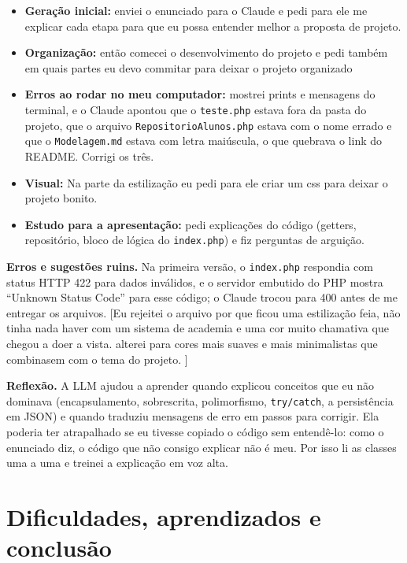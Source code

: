 \documentclass[12pt,a4paper]{article}
\newcommand{\pendente}[1]{{\color{red}[#1]}}
\begin{document}
\begin{itemize}
  \item \textbf{Geração inicial:} enviei o enunciado para o Claude e pedi para ele me explicar cada etapa para que eu possa entender melhor a proposta de projeto.
  \item \textbf{Organização:} então comecei o desenvolvimento do projeto e pedi também em quais partes eu devo commitar para deixar o projeto organizado
  \item \textbf{Erros ao rodar no meu computador:} mostrei prints e mensagens do terminal, e o Claude apontou que o \texttt{teste.php} estava fora da pasta do projeto, que o arquivo \texttt{RepositorioAlunos.php} estava com o nome errado e que o \texttt{Modelagem.md} estava com letra maiúscula, o que quebrava o link do README. Corrigi os três.
  \item \textbf{Visual:} Na parte da estilização eu pedi para ele criar um css para deixar o projeto bonito.
  \item \textbf{Estudo para a apresentação:} pedi explicações do código (getters, repositório, bloco de lógica do \texttt{index.php}) e fiz perguntas de arguição.
\end{itemize}

\textbf{Erros e sugestões ruins.} Na primeira versão, o \texttt{index.php} respondia com status HTTP 422 para dados inválidos, e o servidor embutido do PHP mostra ``Unknown Status Code'' para esse código; o Claude trocou para 400 antes de me entregar os arquivos. \pendente{Eu rejeitei o arquivo por que ficou uma estilização feia, não tinha nada haver com um sistema de academia e uma cor muito chamativa que chegou a doer a vista. alterei para cores mais suaves e mais minimalistas que combinasem com o tema do projeto.
}

\textbf{Reflexão.} A LLM ajudou a aprender quando explicou conceitos que eu não dominava (encapsulamento, sobrescrita, polimorfismo, \texttt{try/catch}, a persistência em JSON) e quando traduziu mensagens de erro em passos para corrigir. Ela poderia ter atrapalhado se eu tivesse copiado o código sem entendê-lo: como o enunciado diz, o código que não consigo explicar não é meu. Por isso li as classes uma a uma e treinei a explicação em voz alta.

\section{Dificuldades, aprendizados e conclusão}
\end{document}
